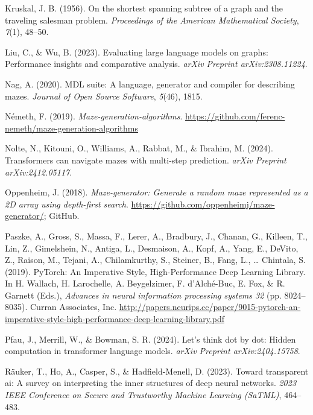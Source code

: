 \documentclass[10pt,a4paper,onecolumn]{article}
\newlength{\cslhangindent}
\newenvironment{CSLReferences}[2] %
 {\begin{list}{}{%
  \setlength{\itemindent}{0pt}
  \setlength{\leftmargin}{0pt}
  \setlength{\parsep}{0pt}
  \ifodd #1
   \setlength{\leftmargin}{\cslhangindent}
   \setlength{\itemindent}{-1\cslhangindent}
  \fi
  \setlength{\itemsep}{#2\baselineskip}}}
 {\end{list}}
\begin{document}
\begin{CSLReferences}{1}{0.5}
\leavevmode{}%
Kruskal, J. B. (1956). On the shortest spanning subtree of a graph and
the traveling salesman problem. \emph{Proceedings of the American
Mathematical Society}, \emph{7}(1), 48--50.

\leavevmode{}%
Liu, C., \& Wu, B. (2023). Evaluating large language models on graphs:
Performance insights and comparative analysis. \emph{arXiv Preprint
arXiv:2308.11224}.

\leavevmode{}%
Nag, A. (2020). MDL suite: A language, generator and compiler for
describing mazes. \emph{Journal of Open Source Software}, \emph{5}(46),
1815.

\leavevmode{}%
Németh, F. (2019). \emph{Maze-generation-algorithms}.
\url{https://github.com/ferenc-nemeth/maze-generation-algorithms}

\leavevmode{}%
Nolte, N., Kitouni, O., Williams, A., Rabbat, M., \& Ibrahim, M. (2024).
Transformers can navigate mazes with multi-step prediction. \emph{arXiv
Preprint arXiv:2412.05117}.

\leavevmode{}%
Oppenheim, J. (2018). \emph{Maze-generator: Generate a random maze
represented as a 2D array using depth-first search}.
\url{https://github.com/oppenheimj/maze-generator/}; GitHub.

\leavevmode{}%
Paszke, A., Gross, S., Massa, F., Lerer, A., Bradbury, J., Chanan, G.,
Killeen, T., Lin, Z., Gimelshein, N., Antiga, L., Desmaison, A., Kopf,
A., Yang, E., DeVito, Z., Raison, M., Tejani, A., Chilamkurthy, S.,
Steiner, B., Fang, L., \ldots{} Chintala, S. (2019). {PyTorch: An
Imperative Style, High-Performance Deep Learning Library}. In H.
Wallach, H. Larochelle, A. Beygelzimer, F. d'Alché-Buc, E. Fox, \& R.
Garnett (Eds.), \emph{Advances in neural information processing systems
32} (pp. 8024--8035). Curran Associates, Inc.
\url{http://papers.neurips.cc/paper/9015-pytorch-an-imperative-style-high-performance-deep-learning-library.pdf}

\leavevmode{}%
Pfau, J., Merrill, W., \& Bowman, S. R. (2024). Let's think dot by dot:
Hidden computation in transformer language models. \emph{arXiv Preprint
arXiv:2404.15758}.

\leavevmode{}%
Räuker, T., Ho, A., Casper, S., \& Hadfield-Menell, D. (2023). Toward
transparent ai: A survey on interpreting the inner structures of deep
neural networks. \emph{2023 IEEE Conference on Secure and Trustworthy
Machine Learning (SaTML)}, 464--483.


\end{CSLReferences}
\end{document}
